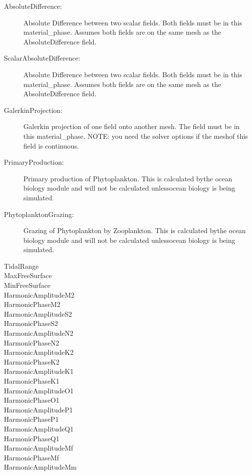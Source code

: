 \begin{description}
\item[AbsoluteDifference:]Absolute Difference between two scalar fields. Both fields must be in this material\_phase. Assumes both fields are on the same mesh as the AbsoluteDifference field.  
\item[ScalarAbsoluteDifference:]Absolute Difference between two scalar fields. Both fields must be in this material\_phase. Assumes both fields are on the same mesh as the AbsoluteDifference field.  
\item[GalerkinProjection:]Galerkin projection of one field onto another mesh. The field must be in this material\_phase. 
	NOTE: you need the solver options if the meshof this field is continuous.  
\item[PrimaryProduction:]Primary production of Phytoplankton. This is calculated bythe ocean biology module and will not be calculated unlessocean biology is being simulated.  
\item[PhytoplanktonGrazing:]Grazing of Phytoplankton by Zooplankton. This is calculated bythe ocean biology module and will not be calculated unlessocean biology is being simulated.  
\item[TidalRange]  
\item[MaxFreeSurface]  
\item[MinFreeSurface]  
\item[HarmonicAmplitudeM2]  
\item[HarmonicPhaseM2]  
\item[HarmonicAmplitudeS2]  
\item[HarmonicPhaseS2]  
\item[HarmonicAmplitudeN2]  
\item[HarmonicPhaseN2]  
\item[HarmonicAmplitudeK2]  
\item[HarmonicPhaseK2]  
\item[HarmonicAmplitudeK1]  
\item[HarmonicPhaseK1]  
\item[HarmonicAmplitudeO1]  
\item[HarmonicPhaseO1]  
\item[HarmonicAmplitudeP1]  
\item[HarmonicPhaseP1]  
\item[HarmonicAmplitudeQ1]  
\item[HarmonicPhaseQ1]  
\item[HarmonicAmplitudeMf]  
\item[HarmonicPhaseMf]  
\item[HarmonicAmplitudeMm]  

\end{description}
